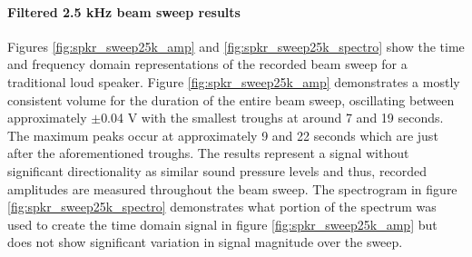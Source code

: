 \paragraph{Filtered 2.5 kHz beam sweep results}
Figures \ref{fig:spkr_sweep25k_amp} and \ref{fig:spkr_sweep25k_spectro} show the time and frequency domain representations of the recorded beam sweep for a traditional loud speaker. Figure \ref{fig:spkr_sweep25k_amp} demonstrates a mostly consistent volume for the duration of the entire beam sweep, oscillating between approximately $\pm$0.04 V with the smallest troughs at around 7 and 19 seconds. The maximum peaks occur at approximately 9 and 22 seconds which are just after the aforementioned troughs. The results represent a signal without significant directionality as similar sound pressure levels and thus, recorded amplitudes are measured throughout the beam sweep. The spectrogram in figure \ref{fig:spkr_sweep25k_spectro} demonstrates what portion of the spectrum was used to create the time domain signal in figure \ref{fig:spkr_sweep25k_amp} but does not show significant variation in signal magnitude over the sweep.
